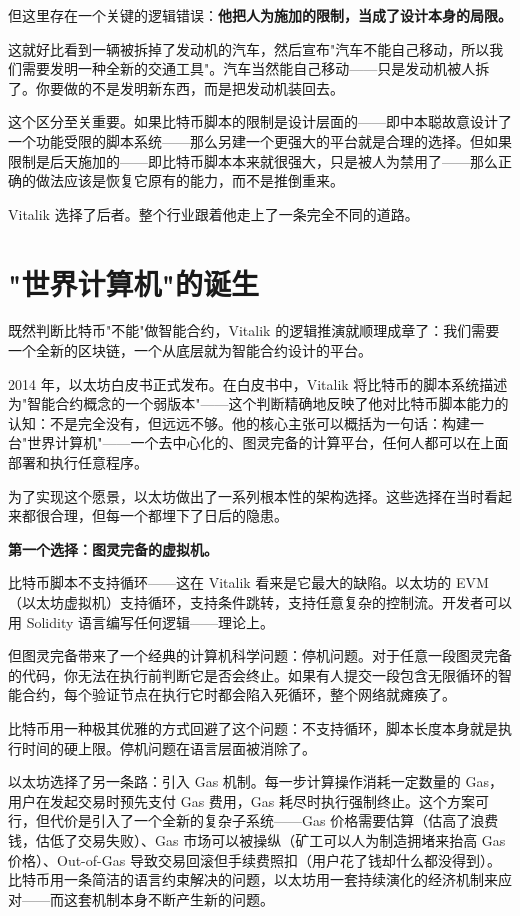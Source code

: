 \documentclass[a4paper,12pt,openany]{ctexbook}
\begin{document}
但这里存在一个关键的逻辑错误：\textbf{他把人为施加的限制，当成了设计本身的局限。}

这就好比看到一辆被拆掉了发动机的汽车，然后宣布"汽车不能自己移动，所以我们需要发明一种全新的交通工具"。汽车当然能自己移动——只是发动机被人拆了。你要做的不是发明新东西，而是把发动机装回去。

这个区分至关重要。如果比特币脚本的限制是设计层面的——即中本聪故意设计了一个功能受限的脚本系统——那么另建一个更强大的平台就是合理的选择。但如果限制是后天施加的——即比特币脚本本来就很强大，只是被人为禁用了——那么正确的做法应该是恢复它原有的能力，而不是推倒重来。

Vitalik 选择了后者。整个行业跟着他走上了一条完全不同的道路。


\section*{"世界计算机"的诞生}


既然判断比特币"不能"做智能合约，Vitalik 的逻辑推演就顺理成章了：我们需要一个全新的区块链，一个从底层就为智能合约设计的平台。

2014 年，以太坊白皮书正式发布。在白皮书中，Vitalik 将比特币的脚本系统描述为"智能合约概念的一个弱版本"——这个判断精确地反映了他对比特币脚本能力的认知：不是完全没有，但远远不够。他的核心主张可以概括为一句话：构建一台"世界计算机"——一个去中心化的、图灵完备的计算平台，任何人都可以在上面部署和执行任意程序。

为了实现这个愿景，以太坊做出了一系列根本性的架构选择。这些选择在当时看起来都很合理，但每一个都埋下了日后的隐患。

\textbf{第一个选择：图灵完备的虚拟机。}

比特币脚本不支持循环——这在 Vitalik 看来是它最大的缺陷。以太坊的 EVM（以太坊虚拟机）支持循环，支持条件跳转，支持任意复杂的控制流。开发者可以用 Solidity 语言编写任何逻辑——理论上。

但图灵完备带来了一个经典的计算机科学问题：停机问题。对于任意一段图灵完备的代码，你无法在执行前判断它是否会终止。如果有人提交一段包含无限循环的智能合约，每个验证节点在执行它时都会陷入死循环，整个网络就瘫痪了。

比特币用一种极其优雅的方式回避了这个问题：不支持循环，脚本长度本身就是执行时间的硬上限。停机问题在语言层面被消除了。

以太坊选择了另一条路：引入 Gas 机制。每一步计算操作消耗一定数量的 Gas，用户在发起交易时预先支付 Gas 费用，Gas 耗尽时执行强制终止。这个方案可行，但代价是引入了一个全新的复杂子系统——Gas 价格需要估算（估高了浪费钱，估低了交易失败）、Gas 市场可以被操纵（矿工可以人为制造拥堵来抬高 Gas 价格）、Out-of-Gas 导致交易回滚但手续费照扣（用户花了钱却什么都没得到）。比特币用一条简洁的语言约束解决的问题，以太坊用一套持续演化的经济机制来应对——而这套机制本身不断产生新的问题。
\end{document}
